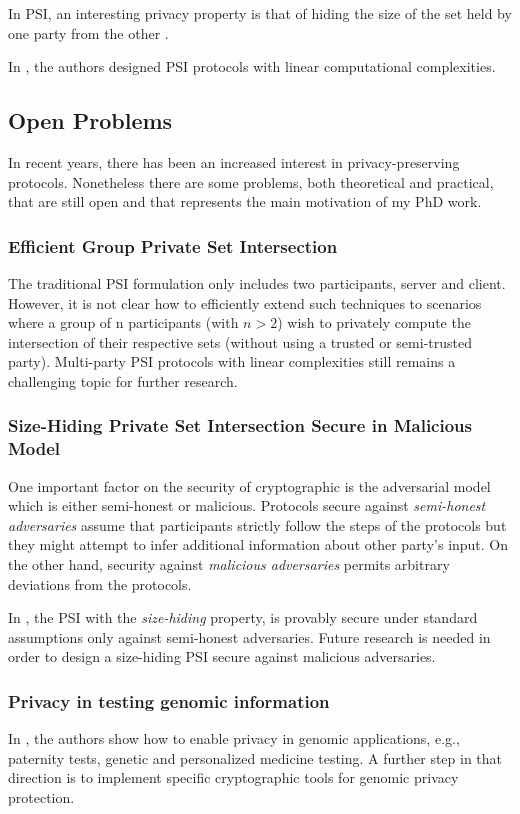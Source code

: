 \documentclass[dvips,12pt]{article}
\begin{document}
In PSI, an interesting privacy property is that of hiding the size of the set held by one party from the other \cite{size-psi}.

In \cite{lin-psi,linear-psi}, the authors designed PSI protocols with linear computational complexities.

\subsection{Open Problems}
In recent years, there has been an increased interest in privacy-preserving protocols. 
Nonetheless there are some problems, both theoretical and practical, that are still open and that represents the main motivation of my PhD work.
\subsubsection{Efficient Group Private Set Intersection}
The traditional PSI formulation only includes two participants, server and client. However, it is not clear how to efficiently extend such techniques to scenarios where a group of n participants (with $n > 2$) wish to privately compute the intersection of their respective sets (without using a trusted or semi-trusted party). Multi-party PSI protocols with linear complexities still remains a challenging topic for further research.
\subsubsection{Size-Hiding Private Set Intersection Secure in Malicious Model}
One important factor on the security of cryptographic is the adversarial model which is either semi-honest or malicious. Protocols secure against \emph{semi-honest adversaries} assume that participants strictly follow the steps of the protocols but they might attempt to infer additional information about other party's input. On the other hand, security against \emph{malicious adversaries} permits arbitrary deviations from the protocols.

In \cite{size-psi}, the PSI with the \emph{size-hiding} property, is provably secure under standard assumptions only against semi-honest adversaries. Future research is needed in order to design a size-hiding PSI secure against malicious adversaries.  
\subsubsection{Privacy in testing genomic information}
In \cite{genome}, the authors show how to enable privacy in genomic applications, e.g., paternity tests, genetic and personalized medicine testing. A further step in that direction is to implement specific cryptographic tools for genomic privacy protection.
\end{document}
